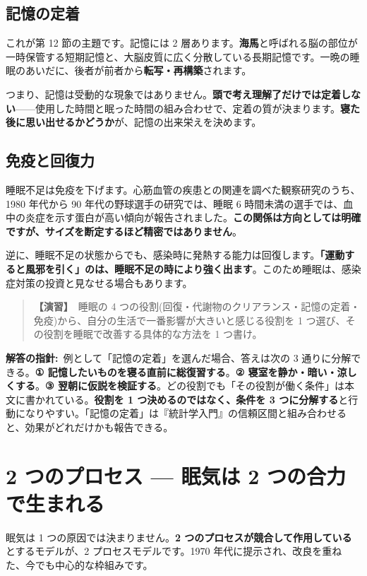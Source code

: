 \documentclass{article}
\begin{document}
\subsection{記憶の定着}

これが第 12 節の主題です。記憶には 2 層あります。\textbf{海馬}と呼ばれる脳の部位が一時保管する短期記憶と、大脳皮質に広く分散している長期記憶です。一晩の睡眠のあいだに、後者が前者から\textbf{転写・再構築}されます。

つまり、記憶は受動的な現象ではありません。\textbf{頭で考え理解了だけでは定着しない}——使用した時間と眠った時間の組み合わせで、定着の質が決まります。\textbf{寝た後に思い出せるかどうか}が、記憶の出来栄えを決めます。

\subsection{免疫と回復力}

睡眠不足は免疫を下げます。心筋血管の疾患との関連を調べた観察研究のうち、1980 年代から 90 年代の野球選手の研究では、睡眠 6 時間未満の選手では、血中の炎症を示す蛋白が高い傾向が報告されました。\textbf{この関係は方向としては明確ですが、サイズを断定するほど精密ではありません}。

逆に、睡眠不足の状態からでも、感染時に発熱する能力は回復します。\textbf{「運動すると風邪を引く」のは、睡眠不足の時により強く出ます}。このため睡眠は、感染症対策の投資と見なせる場合もあります。

\begin{quote}
\textbf{【演習】}\ 睡眠の 4 つの役割(回復・代謝物のクリアランス・記憶の定着・免疫)から、自分の生活で一番影響が大きいと感じる役割を 1 つ選び、その役割を睡眠で改善する具体的な方法を 1 つ書け。
\end{quote}

\textbf{解答の指針:}\ 例として「記憶の定着」を選んだ場合、答えは次の 3 通りに分解できる。\textbf{① 記憶したいものを寝る直前に総復習する}。\textbf{② 寝室を静か・暗い・涼しくする}。\textbf{③ 翌朝に仮説を検証する}。どの役割でも「その役割が働く条件」は本文に書かれている。\textbf{役割を 1 つ決めるのではなく、条件を 3 つに分解する}と行動になりやすい。「記憶の定着」は『統計学入門』の信頼区間と組み合わせると、効果がどれだけかも報告できる。

\section{2 つのプロセス — 眠気は 2 つの合力で生まれる}

眠気は 1 つの原因では決まりません。\textbf{2 つのプロセスが競合して作用している}とするモデルが、2 プロセスモデルです。1970 年代に提示され、改良を重ねた、今でも中心的な枠組みです。
\end{document}
